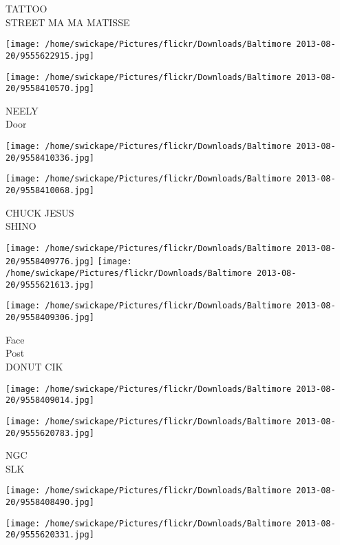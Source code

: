 \documentclass[10pt,letterpaper]{article}
\begin{document}
TATTOO\\
STREET MA MA MATISSE\\
\pagebreak

\texttt{[image: /home/swickape/Pictures/flickr/Downloads/Baltimore 2013-08-20/9555622915.jpg]}

\vspace{0.25in}
\texttt{[image: /home/swickape/Pictures/flickr/Downloads/Baltimore 2013-08-20/9558410570.jpg]}

NEELY\\
Door\\
\pagebreak

\texttt{[image: /home/swickape/Pictures/flickr/Downloads/Baltimore 2013-08-20/9558410336.jpg]}

\vspace{0.25in}
\texttt{[image: /home/swickape/Pictures/flickr/Downloads/Baltimore 2013-08-20/9558410068.jpg]}

CHUCK JESUS\\
SHINO\\
\pagebreak

\texttt{[image: /home/swickape/Pictures/flickr/Downloads/Baltimore 2013-08-20/9558409776.jpg]}
\texttt{[image: /home/swickape/Pictures/flickr/Downloads/Baltimore 2013-08-20/9555621613.jpg]}

\vspace{0.25in}
\texttt{[image: /home/swickape/Pictures/flickr/Downloads/Baltimore 2013-08-20/9558409306.jpg]}

Face\\
Post\\
DONUT CIK\\
\pagebreak

\texttt{[image: /home/swickape/Pictures/flickr/Downloads/Baltimore 2013-08-20/9558409014.jpg]}

\vspace{0.25in}
\texttt{[image: /home/swickape/Pictures/flickr/Downloads/Baltimore 2013-08-20/9555620783.jpg]}

NGC\\
SLK\\
\pagebreak

\texttt{[image: /home/swickape/Pictures/flickr/Downloads/Baltimore 2013-08-20/9558408490.jpg]}

\vspace{0.25in}
\texttt{[image: /home/swickape/Pictures/flickr/Downloads/Baltimore 2013-08-20/9555620331.jpg]}
\end{document}

